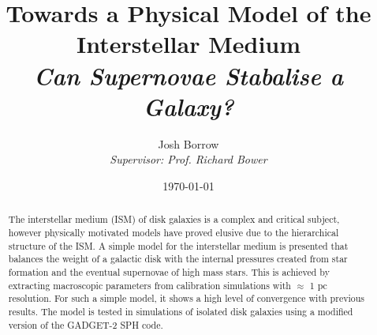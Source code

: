 
\begin{titlepage}

\thispagestyle{empty}

\author{Josh Borrow\\
\emph{Supervisor: Prof. Richard Bower}}
\date{\today}
    \title{Towards a Physical Model of the Interstellar Medium\\
\vspace{4mm}
\large \emph{Can Supernovae Stabalise a Galaxy?}}
\maketitle

\vspace{10mm}
\begin{abstract}
The interstellar medium (ISM) of disk galaxies is a complex and critical subject, however physically motivated models have proved elusive due to the hierarchical structure of the ISM. A simple model for the interstellar medium is presented that balances the weight of a galactic disk with the internal pressures created from star formation and the eventual supernovae of high mass stars. This is achieved by extracting macroscopic parameters from calibration simulations with $\approx$ 1 pc resolution. For such a simple model, it shows a high level of convergence with previous results. The model is tested in simulations of isolated disk galaxies using a modified version of the GADGET-2 SPH code.
\end{abstract}

\end{titlepage}

\newpage

